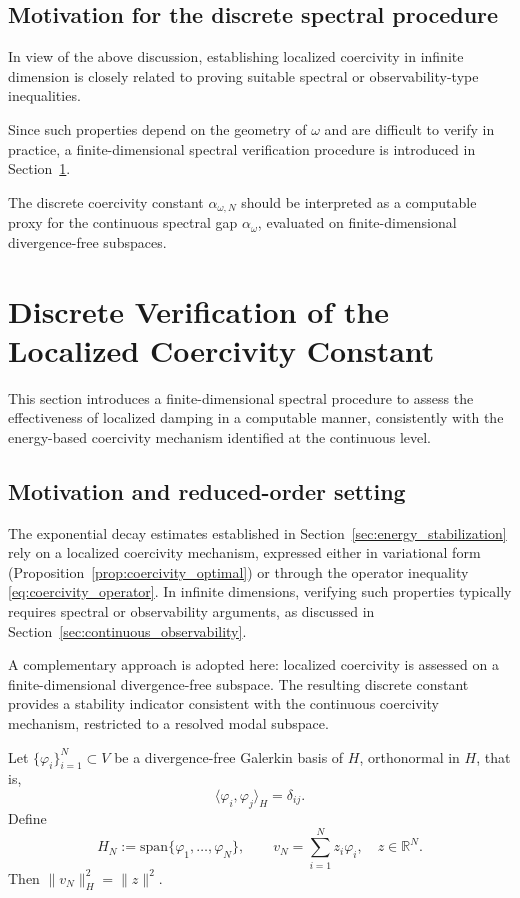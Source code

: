 \documentclass[preprint,12pt]{elsarticle}
\begin{document}
\subsection{Motivation for the discrete spectral procedure}

In view of the above discussion, establishing localized coercivity in infinite
dimension is closely related to proving suitable spectral or observability-type
inequalities.

Since such properties depend on the geometry of $\omega$ and are difficult to
verify in practice, a finite-dimensional spectral verification procedure is
introduced in Section~\ref{sec:discrete_coercivity}.

The discrete coercivity constant $\alpha_{\omega,N}$ should be interpreted as a
computable proxy for the continuous spectral gap $\alpha_\omega$, evaluated on
finite-dimensional divergence-free subspaces.

\section{Discrete Verification of the Localized Coercivity Constant}
\label{sec:discrete_coercivity}

This section introduces a finite-dimensional spectral procedure to assess the
effectiveness of localized damping in a computable manner, consistently with the
energy-based coercivity mechanism identified at the continuous level.

\subsection{Motivation and reduced-order setting}

The exponential decay estimates established in
Section~\ref{sec:energy_stabilization} rely on a localized coercivity mechanism,
expressed either in variational form
(Proposition~\ref{prop:coercivity_optimal}) or through the operator inequality
\eqref{eq:coercivity_operator}.
In infinite dimensions, verifying such properties typically requires spectral or
observability arguments, as discussed in
Section~\ref{sec:continuous_observability}.

A complementary approach is adopted here: localized coercivity is assessed on a
finite-dimensional divergence-free subspace.
The resulting discrete constant provides a stability indicator consistent with
the continuous coercivity mechanism, restricted to a resolved modal subspace.

Let $\{\varphi_i\}_{i=1}^N \subset V$ be a divergence-free Galerkin basis of $H$,
orthonormal in $H$, that is,
\[
\langle \varphi_i,\varphi_j\rangle_H = \delta_{ij}.
\]
Define
\[
H_N := \mathrm{span}\{\varphi_1,\ldots,\varphi_N\}, \qquad
v_N = \sum_{i=1}^N z_i \varphi_i,\quad z\in\mathbb{R}^N.
\]
Then $\|v_N\|_H^2 = \|z\|^2$.
\end{document}
